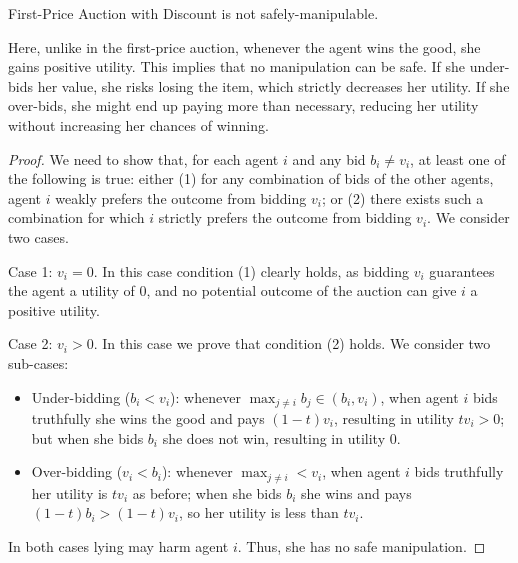 \begin{lemmarep}
    First-Price Auction with Discount is not safely-manipulable. 
\end{lemmarep}
\begin{proofsketch}
    Here, unlike in the first-price auction, whenever the agent wins the good, she gains positive utility.  This implies that no manipulation can be safe. If she under-bids her value, she risks losing the item, which strictly decreases her utility. If she over-bids, she might end up paying more than necessary, reducing her utility without increasing her chances of winning.
\end{proofsketch}
\begin{proof}
We need to show that, for each agent $i$ and any bid $b_i\neq v_i$, at least one of the following is true: either (1) for any combination of bids of the other agents, agent $i$ weakly prefers the outcome from bidding $v_i$; or (2) there exists such a combination for which $i$ strictly prefers the outcome from bidding $v_i$. We consider two cases.

Case 1: $v_i = 0$. In this case condition (1) clearly holds, as bidding $v_i$ guarantees the agent a utility of $0$, and no potential outcome of the auction can give $i$ a positive utility.

Case 2: $v_i > 0$. In this case we prove that condition (2) holds. We consider two sub-cases:
\begin{itemize}
\item Under-bidding ($b_i<v_i$): 
    whenever $\displaystyle \max_{j\neq i}b_j \in (b_i,v_i)$, 
when agent $i$ bids truthfully she wins the good and pays $(1-t) v_i$, resulting in utility $t v_i > 0$;
but when she bids $b_i$ she does not win, resulting in utility $0$.

\item Over-bidding ($v_i<b_i$): 
    whenever $\displaystyle \max_{j\neq i} < v_i$, 
when agent $i$ bids truthfully her utility is $t v_i$ as before;
when she bids $b_i$ she wins and pays $(1-t)b_i > (1-t)v_i$, so her utility is less than $t v_i$.
\end{itemize}
In both cases lying may harm agent $i$. Thus, she has no safe manipulation. 
\end{proof}

